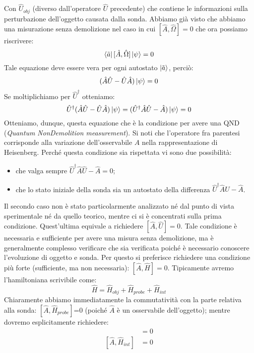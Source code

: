 Con $\hat U_{obj}$ (diverso dall'operatore $\hat U$ precedente) che contiene le informazioni sulla perturbazione dell'oggetto causata dalla sonda.
\vspace{0.5cm}
Abbiamo già visto che abbiamo una misurazione senza demolizione nel caso in cui $[\hat A, \hat \Omega]=0$ che ora possiamo riscrivere:
\begin{equation*}
    \bra{\tilde a}[\hat A, \hat \Omega] \ket{\psi}=0  
\end{equation*}
Tale equazione deve essere vera per ogni autostato $\ket{\tilde a}$, perciò:
\begin{equation*}
    (\hat A \hat U - \hat U \hat A)\ket{\psi}= 0
\end{equation*}
Se moltiplichiamo per $\hat U^\dagger$ otteniamo:
\begin{equation*}
    \hat U ^\dagger (\hat A \hat U - \hat U \hat A)\ket{\psi}= (\hat U^\dagger \hat A \hat U - \hat A ) \ket{\psi}=0
\end{equation*}
Otteniamo, dunque, questa equazione che è la condizione per avere una QND (\textit{Quantum NonDemolition measurement}). Si noti che l'operatore fra parentesi corrisponde alla variazione dell'osservabile $A$ nella rappresentazione di Heisenberg.
Perché questa condizione sia rispettata vi sono due possibilità:
\begin{itemize}
    \item che valga sempre $\hat U ^\dagger \hat A \hat U-\hat A = 0$;
    \item che lo stato iniziale della sonda sia un autostato della differenza $\hat U^\dagger \hat A \hat U - \hat A$.
\end{itemize}
Il secondo caso non è stato particolarmente analizzato né dal punto di vista sperimentale né da quello teorico, mentre ci si è concentrati sulla prima condizione.
Quest'ultima equivale a richiedere $[\hat A, \hat U] = 0$. Tale condizione è necessaria e sufficiente per avere una misura senza demolizione, ma è generalmente complesso verificare che sia verificata poiché è necessario conoscere l'evoluzione di oggetto e sonda.
Per questo si preferisce richiedere una condizione più forte (sufficiente, ma non necessaria): $[\hat A, \hat H]=0$.
Tipicamente avremo l'hamiltoniana scrivibile come:
\begin{equation*}
    \hat H = \hat H_{obj} + \hat H_{probe}+\hat H_{int}
\end{equation*}
Chiaramente abbiamo immediatamente la commutatività con la parte relativa alla sonda: $[\hat A, \hat H_{probe}]$=0 (poiché $\hat A$ è un osservabile dell'oggetto); mentre dovremo esplicitamente richiedere:
\begin{align}
    [\hat A , \hat H_{obj} ] &= 0\\
    [\hat A , \hat H_{int} ] &= 0
\end{align}
